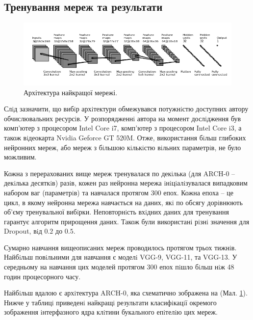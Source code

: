 \subsection{Тренування мереж та результати}

\begin{figure}[t!]
	\includegraphics[width=\linewidth]{Figures/Chapter4/best_model.png}
	\caption{Архітектура найкращої мережі.}
	\label{fig:best_model}
\end{figure}

Слiд зазначити, що вибiр архiтектури обмежувався потужнiстю доступних автору обчислювальних ресурсiв. У розпорядженнi автора на момент дослiдження був комп'ютер з процесором Intel Core i7, комп'ютер з процесором Intel Core i3, а також вiдеокарта Nvidia Geforce GT 520M. Отже, використання бiльш глибоких нейронних мереж, або мереж з бiльшою кiлькiстю вiльних параметрiв, не було можливим.

Кожна з перерахованих вище мереж тренувалася по декiлька (для ARCH-0 -- декiлька десяткiв) разiв, кожен раз нейронна мережа iнiцiалiзувалася випадковим набором ваг (параметрiв) та навчалася протягом 300 епох. Кожна епоха -- це цикл, в якому нейронна мережа навчається на даних, якi по обсягу дорiвнюють об'єму тренувальної вибiрки. Неповторнiсть вхiдних даних для тренування гарантує алгоритм прирощення даних. Також були використанi рiзнi значення для Dropout, вiд \(0.2\) до \(0.5\).

Сумарно навчання вищеописаних мереж проводилось протягом трьох тижнiв. Найбiльш повiльними для навчання є моделi VGG-9, VGG-11, та VGG-13. У середньому на навчання цих моделей протягом 300 епох пiшло бiльш нiж 48 годин процесорного часу.

Найбiльш вдалою є архiтектура ARCH-0, яка схематично зображена на (Мал. \ref{fig:best_model}). Нижче у таблицi приведенi найкращi результати класифiкацiї окремого зображення iнтерфазного ядра клiтини букального епiтелiю цих мереж.

